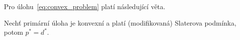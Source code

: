 Pro úlohu~\ref{eq:convex_problem} platí následující věta.
\begin{vt2}[Slaterova]
    Nechť primární úloha je konvexní a platí (modifikovaná) Slaterova podmínka, potom $p^* = d^*$.
\end{vt2}


